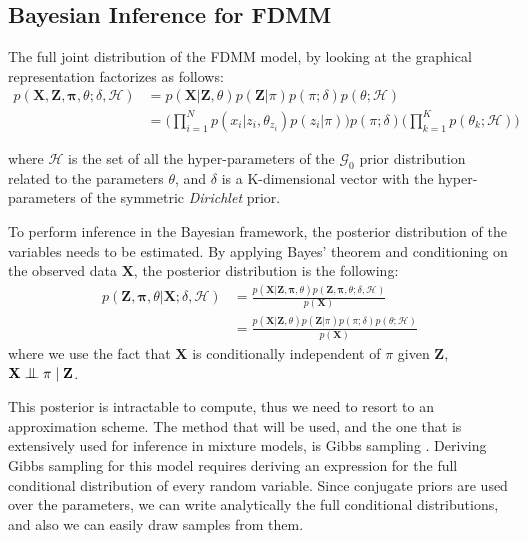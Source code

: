 \subsection{Bayesian Inference for FDMM} \label{fdmm-gibbs-subsect}
The full joint distribution of the FDMM model, by looking at the graphical representation factorizes as follows:
\begin{equation}
  \begin{aligned}
	p(\mathbf{X},\mathbf{Z},\mathbf{\pi},\theta;\delta,\mathcal{H}) & = p(\mathbf{X}|\mathbf{Z},\theta) p(\mathbf{Z}|\pi) p(\pi ;\delta) p(\theta ; \mathcal{H}) \\
	   & = \bigg(\prod\limits_{i=1}^{N} p(x_{i}|z_{i},\theta_{z_{i}}) p(z_{i}|\pi)\bigg) p(\pi;\delta) \bigg(\prod\limits_{k=1}^{K} p(\theta_{k}; \mathcal{H})\bigg)
  \end{aligned}
\end{equation}

where $\mathcal{H}$ is the set of all the hyper-parameters of the $\mathcal{G}_{0}$ prior distribution related to the parameters $\theta$, and $\delta$ is a K-dimensional vector with the hyper-parameters of the symmetric \emph{Dirichlet} prior. 

To perform inference in the Bayesian framework, the posterior distribution of the variables needs to be estimated. By applying Bayes' theorem and conditioning on the observed data $\mathbf{X}$, the posterior distribution is the following:
\begin{equation}%
  \begin{aligned}
	p(\mathbf{Z},\mathbf{\pi},\theta|\mathbf{X} ;\delta,\mathcal{H}) & = \frac{p(\mathbf{X}|\mathbf{Z},\mathbf{\pi},\theta) p(\mathbf{Z},\mathbf{\pi},\theta ;\delta,\mathcal{H})}{p(\mathbf{X})} \\
	   & = \frac{p(\mathbf{X}|\mathbf{Z},\theta) p(\mathbf{Z}|\pi) p(\pi;\delta) p(\theta; \mathcal{H})} {p(\mathbf{X})}
  \end{aligned}
\end{equation}
where we use the fact that $\mathbf{X}$ is conditionally independent of $\pi$ given $\mathbf{Z}$, \ie $\mathbf{X} \bigCI \pi \mid \mathbf{Z}$.

This posterior is intractable to compute, thus we need to resort to an approximation scheme. The method that will be used, and the one that is extensively used for inference in mixture models, is Gibbs sampling \citep{Geman1984}. Deriving Gibbs sampling for this model requires deriving an expression for the full conditional distribution of every random variable. Since conjugate priors are used over the parameters, we can write analytically the full conditional distributions, and also we can easily draw samples from them.

